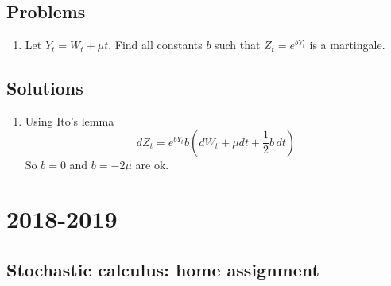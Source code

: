 \documentclass[12pt, a4paper]{article}
\begin{document}
\subsection{Problems}
\begin{enumerate}
\item Let $Y_t = W_t +\mu t$. Find all constants $b$ such that $Z_t = e^{bY_t}$ is a martingale.

\end{enumerate}

\subsection{Solutions}
\begin{enumerate}
\item Using Ito's lemma
\[
dZ_t = e^{bY_t}b \left(dW_t + \mu dt + \frac{1}{2}b \, dt \right)
\]
So $b=0$ and $b=-2\mu$ are ok.

\end{enumerate}

\section{2018-2019}

\subsection{Stochastic calculus: home assignment}
\end{document}
